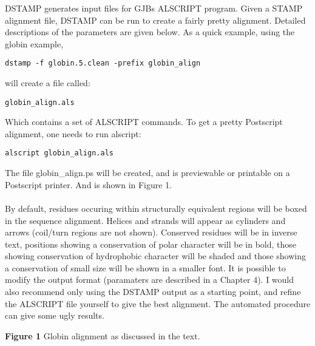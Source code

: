 DSTAMP generates input files for GJBs ALSCRIPT program.  Given a STAMP 
alignment file, DSTAMP can be run to create a fairly pretty alignment.
Detailed descriptions of the parameters are given below.  As a quick 
example, using the globin example,\\

\begin{scriptsize}\begin{verbatim}
dstamp -f globin.5.clean -prefix globin_align
\end{verbatim} \end{scriptsize}

will create a file called:

\begin{scriptsize}\begin{verbatim}
globin_align.als
\end{verbatim} \end{scriptsize}

Which contains a set of ALSCRIPT commands.  To get a pretty Postscript alignment, one needs to
run alscript:\\

\begin{scriptsize}\begin{verbatim}
alscript globin_align.als
\end{verbatim} \end{scriptsize}

The file globin\_align.ps will be created, and is previewable or 
printable on a Postscript printer.  And is shown in Figure 1.\\
\\
By default, residues occuring within
structurally equivalent regions will be boxed in the sequence alignment.
Helices and strands will appear as cylinders and arrows (coil/turn regions
are not shown).  Conserved residues will be in inverse text, positions
showing a conservation of polar character will be in bold, those showing
conservation of hydrophobic character will be shaded and those showing
a conservation of small size will be shown in a smaller font.
It is possible to modify the output format (paramaters are described in a Chapter 4).
I would also recommend only using the DSTAMP output as a starting point, and
refine the ALSCRIPT file yourself to give the best alignment.  The automated
procedure can give some ugly results.

\vspace*{3.5in}
\noindent
\begin{scriptsize}
    {\bf Figure 1} Globin alignment as discussed in the text.
\end{scriptsize}


